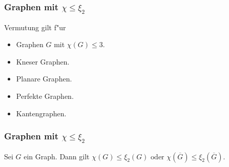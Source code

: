 \documentclass{beamer}
\begin{document}
\begin{frame}[<+->]
  \frametitle{Graphen mit $\chi \leq \xi_{2}$}
  \pause
  Vermutung gilt f"ur 
  \pause
  \begin{itemize}
    \item Graphen $G$ mit $\chi(G) \leq 3$.
    \item Kneser Graphen.
    \item Planare Graphen.
    \item Perfekte Graphen.
    \item Kantengraphen.
  \end{itemize}
  \pause
\end{frame}
 \begin{frame}
   \frametitle{Graphen mit $\chi \leq \xi_{2}$}
   \begin{theorem}
     Sei $G$ ein Graph. Dann gilt $\chi(G) \leq \xi_{2}(G) \text{ oder } \chi(\overline G) \leq \xi_{2}(\overline G)$.
   \end{theorem}
 \end{frame}
\end{document}
